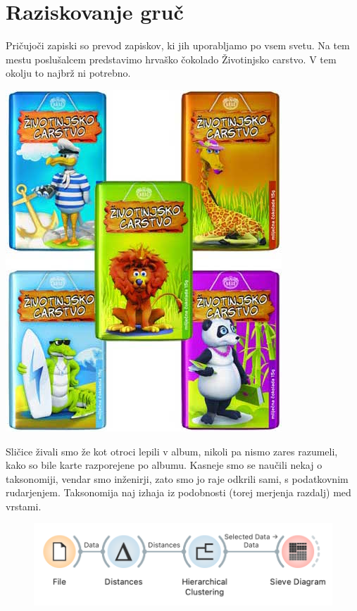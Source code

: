 \chapter{Raziskovanje gruč}
\label{ch:raziskovanje-gruc}

Pričujoči zapiski so prevod zapiskov, ki jih uporabljamo po vsem svetu. Na tem mestu poslušalcem predstavimo hrvaško čokolado Životinjsko carstvo. V tem okolju to najbrž ni potrebno.

\begin{marginfigure}[2cm]
    \includegraphics[width=\linewidth]{zivotinjsko-carstvo.jpg}
    \caption{}
\end{marginfigure}

Sličice živali smo že kot otroci lepili v album, nikoli pa nismo zares razumeli, kako so bile karte razporejene po albumu. Kasneje smo se naučili nekaj o taksonomiji, vendar smo inženirji, zato smo jo raje odkrili sami, s podatkovnim rudarjenjem. Taksonomija naj izhaja iz podobnosti (torej merjenja razdalj) med vrstami.

\begin{figure}[h]
    \includegraphics[width=\linewidth]{workflow1.png}%
    \caption{$\;$}
\end{figure}

